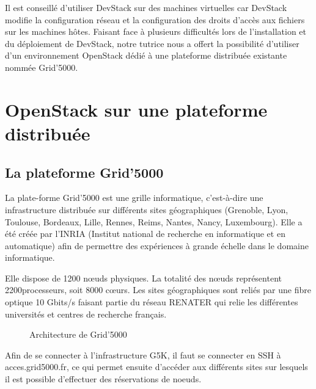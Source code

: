 \documentclass{report}
\begin{document}
    Il est conseillé d'utiliser DevStack sur des machines virtuelles car DevStack modifie la configuration réseau et la configuration des droits d'accès aux fichiers sur les machines hôtes.\newline
    Faisant face à plusieurs difficultés lors de l'installation et du déploiement de DevStack, notre tutrice nous a offert la possibilité d'utiliser d'un environnement OpenStack dédié à une plateforme distribuée existante nommée Grid'5000.


    \section{OpenStack sur une plateforme distribuée}

		\subsection{La plateforme Grid'5000}

La plate-forme Grid’5000 est une grille informatique, c’est-à-dire une infrastructure distribuée sur différents sites géographiques (Grenoble, Lyon, Toulouse, Bordeaux, Lille, Rennes, Reims, Nantes, Nancy, Luxembourg).
Elle a été créée par l'INRIA (Institut national de recherche en informatique et en automatique) afin de permettre des expériences à grande échelle dans le domaine informatique.
\cite{G5K}
\bigbreak

 Elle dispose de 1200 nœuds physiques. La totalité des nœuds représentent 2200processeurs, soit 8000 cœurs.  Les sites géographiques sont reliés par une fibre optique 10 Gbits/s faisant partie du réseau RENATER qui relie les différentes universités et centres de recherche français.
 
 \bigbreak

\begin{figure}[H]
        \caption{Architecture de Grid'5000 \cite{archi_grid}} 
        \label{grid5000}
\end{figure}

Afin de se connecter à l’infrastructure G5K, il faut se connecter en SSH à acces.grid5000.fr, ce qui permet ensuite d’accéder aux différents sites sur lesquels il est possible d’effectuer des réservations de noeuds.
\bigbreak
\end{document}
